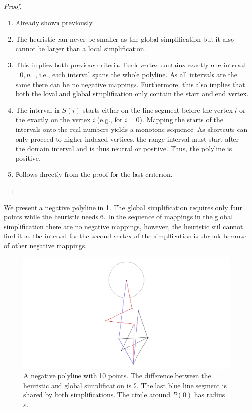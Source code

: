 \begin{proof}
	\begin{enumerate}
	  \item Already shown previously.
		\item The heuristic can never be smaller as the global simplification but it also cannot be larger than a local simplification.
		\item This implies both previous criteria. Each vertex contains exactly one interval \([0, n]\), i.e., each interval spans the whole polyline. As all intervals are the same there can be no negative mappings. Furthermore, this also implies that both the loval and global simplification only contain the start and end vertex.
		\item The interval in \(S(i)\) starts either on the line segment before the vertex \(i\) or the exactly on the vertex \(i\) (e.g., for \(i=0\)). Mapping the starts of the intervals onto the real numbers yields a monotone sequence. As shortcuts can only proceed to higher indexed vertices, the range interval must start after the domain interval and is thus neutral or positive. Thus, the polyline is positive.
		\item Follows directly from the proof for the last criterion.
	\end{enumerate}
\end{proof}

We present a negative polyline in \cref{fig:gii_diff_2}. The global simplification requires only four points while the heuristic needs 6. In the sequence of mappings in the global simplification there are no negative mappings, however, the heuristic stil cannot find it as the interval for the second vertex of the simplfication is shrunk because of other negative mappings. 

\begin{figure}[htb]
  \centering
  \includegraphics[scale=1, width=0.9\linewidth]{./figures/gii_diff_2.png}
	\caption{A negative polyline with 10 points. The difference between the heuristic and global simplification is 2. The last blue line segment is shared by both simplifications. The circle around \(P(0)\) has radius \(\varepsilon\).}
  \label{fig:gii_diff_2}
\end{figure}

